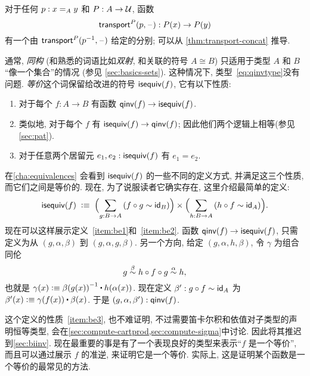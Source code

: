 \begin{eg}
    \label{thm:transportequiv}
    对于任何 $p:\id[A]xy$ 和 $P:A\to\type$, 函数
    \[\transfib{P}{p}{\blank}:P(x) \to P(y)\]
    有一个由 $\transfib{P}{\opp p}{\blank}$ 给定的分别; 可以从 \narrowbreak \cref{thm:transport-concat} 推导.
\end{eg}

通常, \emph{同构}
(和熟悉的词语比如\emph{双射}, 和关联的符号 $A\cong B$)
只适用于类型 $A$ 和 $B$ ``像一个集合''的情况 (参见 \cref{sec:basics-sets}).
这种情况下, 类型~\eqref{eq:qinvtype}没有问题.
\emph{等价}这个词保留给改进的符号 $\isequiv (f)$, 它有以下性质:%
\begin{enumerate}
    \item 对于每个 $f:A\to B$ 有函数 $\qinv(f) \to \isequiv (f)$.\label{item:be1}
    \item 类似地, 对于每个 $f$ 有 $\isequiv (f) \to \qinv(f)$; 因此他们两个逻辑上相等(参见 \cref{sec:pat}).\label{item:be2}
    \item 对于任意两个居留元 $e_1,e_2:\isequiv(f)$ 有 $e_1=e_2$.\label{item:be3}
\end{enumerate}
在\cref{cha:equivalences} 会看到 $\isequiv(f)$ 的一些不同的定义方式, 并满足这三个性质, 而它们之间是等价的.
现在, 为了说服读者它确实存在, 这里介绍最简单的定义:
\begin{equation}
    \label{eq:isequiv-invertible}
    \isequiv(f) \;\defeq\;
    \Parens{\sm{g:B\to A} (f\circ g \htpy \idfunc[B])}
    \times
    \Parens{\sm{h:B\to A} (h\circ f \htpy \idfunc[A])}.
\end{equation}
现在可以这样展示定义~\ref{item:be1}和~\ref{item:be2}.
函数 $\qinv(f) \to \isequiv (f)$, 只需定义为从 $(g,\alpha,\beta)$ 到 $(g,\alpha,g,\beta)$.
另一个方向, 给定 $(g,\alpha,h,\beta)$, 令 $\gamma$ 为组合同伦
\[ g \overset{\beta}{\htpy} h\circ f\circ g \overset{\alpha}{\htpy} h, \]
也就是 $\gamma(x) \defeq \opp{\beta(g(x))} \ct \ap{h}{\alpha(x)}$.
现在定义 $\beta':g\circ f\htpy \idfunc[A]$ 为 $\beta'(x) \defeq \gamma(f(x)) \ct \beta(x)$.
于是 $(g,\alpha,\beta'):\qinv(f)$.

这个定义的性质~\ref{item:be3}, 也不难证明, 不过需要笛卡尔积和依值对子类型的声明恒等类型, 会在\cref{sec:compute-cartprod,sec:compute-sigma}中讨论.
因此将其推迟到\cref{sec:biinv}.
现在最重要的事是有了一个表现良好的类型来表示``$f$ 是一个等价'', 而且可以通过展示 $f$ 的准逆, 来证明它是一个等价.
实际上, 这是证明某个函数是一个等价的最常见的方法.

